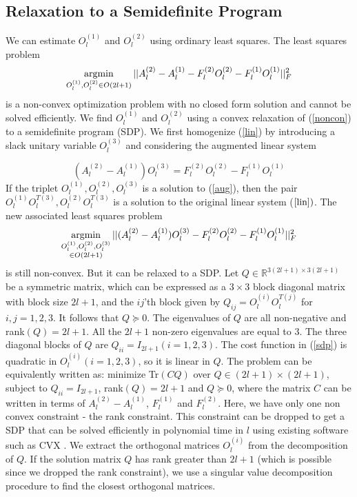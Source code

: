 \documentclass{article}
\newcommand{\argmin}{\operatornamewithlimits{argmin}}
\begin{document}
\subsection{Relaxation to a Semidefinite Program}
We can estimate $O_l^{(1)}$ and $O_l^{(2)}$ using ordinary least squares. The least squares problem
\begin{equation}\label{noncon}
\argmin_{O_l^{(1)}, O_l^{(2)} \in O(2l+1)}
||A_l^{(2)}-A_l^{(1)}-F_l^{(2)}O_l^{(2)}-F_l^{(1)}O_l^{(1)} ||_F^2
\end{equation}
is a non-convex optimization problem with no closed form solution and cannot be
solved efficiently. We find
$O_l^{(1)}$ and $O_l^{(2)}$ using a convex relaxation of (\ref{noncon}) to a
semidefinite program (SDP). We first homogenize (\ref{lin}) by introducing a
slack unitary variable $O_l^{(3)}$ and considering
the augmented linear system

\begin{equation}\label{aug}
(A_l^{(2)}-A_l^{(1)})O_l^{(3)}=F_l^{(2)}O_l^{(2)}-F_l^{(1)}O_l^{(1)}
\end{equation}
If the triplet ${O_l^{(1)},O_l^{(2)},O_l^{(3)}}$ is a solution to (\ref{aug}),
then the pair ${O_l^{(1)}O_l^{T(3)}, O_l^{(2)}O_l^{T(3)}}$
is a solution to the original linear system ($\ref{lin})$. The new associated
least squares problem
\begin{equation}\label{sdp}
\argmin_{%
      \substack{%
        O_l^{(1)}, O_l^{(2)},O_l^{(3)} \\
        \in O(2l+1)
}
      }
||(A_l^{(2)}-A_l^{(1)})O_l^{(3)}-F_l^{(2)}O_l^{(2)}-F_l^{(1)}O_l^{(1)} ||_F^2
\end{equation}
is still non-convex. But it can be relaxed to a SDP. Let $Q \in
\mathbb{R}^{3(2l+1) \times 3(2l+1)}$ be a symmetric matrix, which can be
expressed as a $3 \times 3$
block diagonal matrix with block size $2l+1$, and the $ij$'th block given by
$Q_{ij}=O_l^{(i)}O_l^{T(j)}$ for $i,j=1,2,3$. It follows that $Q \succeq 0$. The eigenvalues of $Q$ are all non-negative and
rank$(Q)=2l+1$. All the $2l+1$ non-zero eigenvalues are equal to 3.
The three diagonal blocks of $Q$ are $Q_{ii}=I_{2l+1} (i=1,2,3).$ The cost
function in (\ref{sdp}) is quadratic in $O_l^{(i)} (i=1,2,3)$, so it is
linear in $Q$. The problem can be equivalently written as:
${\text{minimize}}$ Tr$(CQ)$ over ${Q \in (2l+1) \times (2l+1)}$,
subject to $Q_{ii} = I_{2l+1}$,  rank$(Q) = 2l+1$ and $Q \succeq 0$,
where the matrix $C$ can be written in terms of $A_l^{(2)}-A_l^{(1)}$,
$F_l^{(1)}$ and $F_l^{(2)}$. Here, we have only one non convex constraint - the
rank constraint. This constraint can be dropped to get a SDP that can be solved efficiently in
polynomial time in $l$ using existing software such as CVX \cite{cvx}. We extract
the orthogonal matrices
$O_l^{(i)}$ from the decomposition of $Q$. If the
solution matrix $Q$ has rank greater than $2l+1$ (which is possible since we
dropped the rank constraint),
we use a singular value decomposition procedure \cite{keller} to find the
closest orthogonal matrices.
\end{document}
